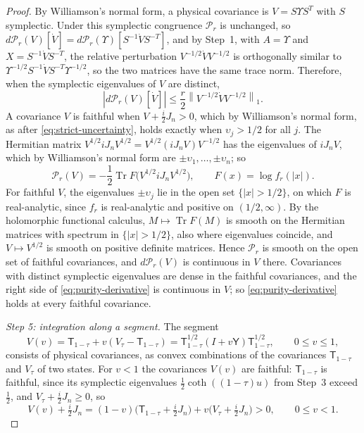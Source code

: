 \documentclass[11pt]{amsart}
\numberwithin{equation}{section}
\theoremstyle{definition}
\newcommand{\Tr}{\operatorname{Tr}}
\newcommand{\norm}[1]{\left\|#1\right\|}
\begin{document}
\begin{proof}
By Williamson's normal form, a physical covariance is
\(V=S\Upsilon S^T\) with \(S\) symplectic. Under this symplectic
congruence \(\mathscr P_r\) is unchanged, so
\(d\mathscr P_r(V)[\dot V]=d\mathscr P_r(\Upsilon)[S^{-1}\dot VS^{-T}]\),
and by Step~1, with \(A=\Upsilon\) and \(X=S^{-1}\dot VS^{-T}\), the
relative perturbation \(V^{-1/2}\dot VV^{-1/2}\) is orthogonally
similar to \(\Upsilon^{-1/2}S^{-1}\dot VS^{-T}\Upsilon^{-1/2}\), so the two
matrices have the same trace norm. Therefore, when the symplectic eigenvalues of
\(V\) are distinct,
\begin{equation}
 |d\mathscr P_r(V)[\dot V]|
 \le\frac r2\norm{V^{-1/2}\dot V V^{-1/2}}_1.
 \label{eq:purity-derivative}
\end{equation}
A covariance \(V\) is
faithful when \(V+\frac i2J_n>0\), which by Williamson's normal form, as
after \eqref{eq:strict-uncertainty}, holds exactly when
\(\upsilon_j>1/2\) for all \(j\). The Hermitian matrix
\(V^{1/2}iJ_nV^{1/2}=V^{1/2}(iJ_nV)V^{-1/2}\) has the eigenvalues of
\(iJ_nV\), which by Williamson's normal form are
\(\pm\upsilon_1,\dots,\pm\upsilon_n\); so
\[
 \mathscr P_r(V)
 =-\frac12\Tr F\bigl(V^{1/2}iJ_nV^{1/2}\bigr),\qquad
 F(x)=\log f_r(|x|).
\]
For faithful \(V\), the eigenvalues \(\pm\upsilon_j\) lie in the open set \(\{|x|>1/2\}\),
on which \(F\) is real-analytic, since \(f_r\) is real-analytic and
positive on \((1/2,\infty)\). By the holomorphic functional calculus,
\(M\mapsto\Tr F(M)\) is smooth on the Hermitian matrices with spectrum
in \(\{|x|>1/2\}\), also where eigenvalues coincide, and \(V\mapsto V^{1/2}\)
is smooth on positive definite matrices. Hence \(\mathscr P_r\) is
smooth on the open set of faithful covariances, and
\(d\mathscr P_r(V)\) is continuous in \(V\) there. Covariances with
distinct symplectic eigenvalues are dense in the faithful covariances,
and the right
side of \eqref{eq:purity-derivative} is continuous in \(V\); so
\eqref{eq:purity-derivative} holds at every faithful covariance.

\smallskip
\emph{Step 5: integration along a segment.} The segment
\[
 V(v)=\mathsf T_{1-\tau}+v(V_\tau-\mathsf T_{1-\tau})
 =\mathsf T_{1-\tau}^{1/2}(I+v\mathsf Y)\mathsf T_{1-\tau}^{1/2},
 \qquad 0\le v\le1,
\]
consists of physical covariances, as convex combinations of the
covariances \(\mathsf T_{1-\tau}\) and \(V_\tau\) of two states. For
\(v<1\) the covariances \(V(v)\) are faithful: \(\mathsf T_{1-\tau}\) is
faithful, since its symplectic eigenvalues \(\frac12\coth((1-\tau)u)\)
from Step~3 exceed \(\frac12\), and \(V_\tau+\frac i2J_n\ge0\), so
\[
 V(v)+\tfrac i2J_n
 =(1-v)\bigl(\mathsf T_{1-\tau}+\tfrac i2J_n\bigr)
 +v\bigl(V_\tau+\tfrac i2J_n\bigr)>0,
 \qquad 0\le v<1.
\]


\end{proof}
\end{document}
